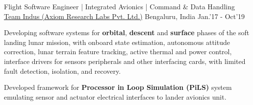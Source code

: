 \begin{cventries}
	\cventry
	{\large Flight Software Engineer | Integrated Avionics | Command \& Data Handling}
	{\href{http://www.teamindus.in/}{Team Indus (Axiom Research Labs Pvt. Ltd.)}}
	{\large Bengaluru, India}
	{\large Jan.'17 - Oct'19}
	{
		\begin{cvitems}
		        \item{\large Developing software systems for \textbf{orbital}, \textbf{descent} and \textbf{surface} phases of the soft landing lunar mission, with onboard state estimation, autonomous attitude correction, lunar terrain feature tracking, active thermal and power control, interface drivers for sensors peripherals and other interfacing cards, with limited fault detection, isolation, and recovery.}
			\item{\large Developed framework for \textbf{Processor in Loop Simulation (PiLS)} system emulating sensor and actuator electrical interfaces to lander avionics unit.}
		\end{cvitems}
	}
\end{cventries}
